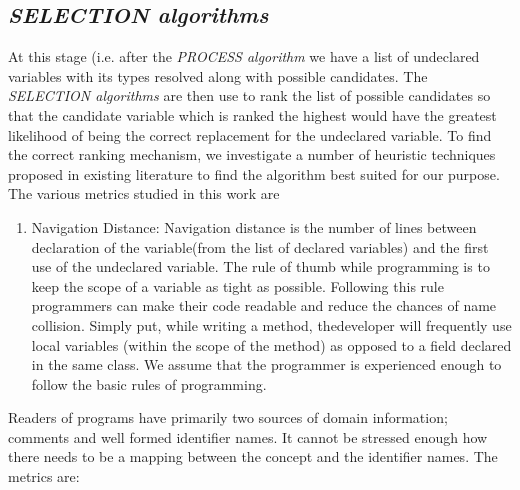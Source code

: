 \subsection{\textit{SELECTION algorithms}}
At this stage (i.e. after the \textit{PROCESS algorithm} we have a list of undeclared variables with its types resolved along with possible candidates. The \textit{SELECTION algorithms} are then use to rank the list of possible candidates so that the candidate variable which is ranked the highest would have the greatest likelihood of being the correct replacement for the undeclared variable. To find the correct ranking mechanism, we investigate a number of heuristic techniques proposed in existing literature to find the algorithm best suited for our purpose.  The various metrics studied in this work  are
\begin{enumerate}
\item Navigation Distance:
Navigation distance is the number of lines between declaration of the variable(from the list of declared variables) and the first use of the undeclared variable. The rule of thumb while programming is to keep the scope of a variable as tight as possible. Following this rule programmers can make their code readable and reduce the chances of name collision. Simply put, while writing a method, thedeveloper will frequently use local variables (within the scope of the method) as opposed to a field declared in the same class. We assume that the programmer is experienced enough to follow the basic rules of programming.
\end{enumerate}
Readers of programs have primarily two sources of domain information; comments and well formed identifier names. It cannot be stressed enough how there needs to be a mapping between the concept and the identifier names. The metrics are: 

